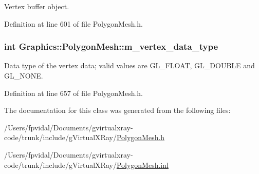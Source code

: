 Vertex buffer object. 



Definition at line 601 of file PolygonMesh.h.

\hypertarget{class_graphics_1_1_polygon_mesh_aada40563d8efefb4cddec11ee124fdb7}{
\subsubsection[{m\_\-vertex\_\-data\_\-type}]{\setlength{\rightskip}{0pt plus 5cm}int {\bf Graphics::PolygonMesh::m\_\-vertex\_\-data\_\-type}}}
\label{class_graphics_1_1_polygon_mesh_aada40563d8efefb4cddec11ee124fdb7}


Data type of the vertex data; valid values are GL\_\-FLOAT, GL\_\-DOUBLE and GL\_\-NONE. 



Definition at line 657 of file PolygonMesh.h.



The documentation for this class was generated from the following files:\begin{DoxyCompactItemize}
\item 
/Users/fpvidal/Documents/gvirtualxray-\/code/trunk/include/gVirtualXRay/\hyperlink{_polygon_mesh_8h}{PolygonMesh.h}\item 
/Users/fpvidal/Documents/gvirtualxray-\/code/trunk/include/gVirtualXRay/\hyperlink{_polygon_mesh_8inl}{PolygonMesh.inl}\end{DoxyCompactItemize}
